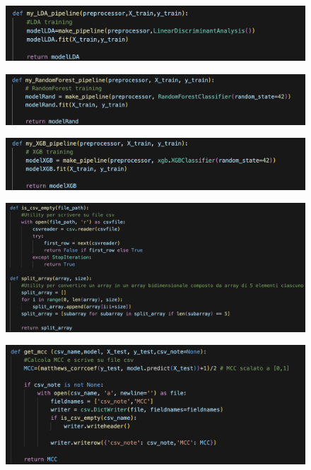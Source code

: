 \begin{appendices}
\begin{figure}[H]
    \centering
    \includegraphics[width=1\linewidth]{4.png}
    \label{fig:enter-label}
\end{figure}

\begin{figure}[H]
    \centering
    \includegraphics[width=1\linewidth]{5.png}
    \label{fig:enter-label}
\end{figure}

\begin{figure}[H]
    \centering
    \includegraphics[width=1\linewidth]{6.png}
    \label{fig:enter-label}
\end{figure}

\begin{figure}[H]
    \centering
    \includegraphics[width=1\linewidth]{7.png}
    \label{fig:enter-label}
\end{figure}

\begin{figure}[H]
    \centering
    \includegraphics[width=1\linewidth]{8.png}
    \label{fig:enter-label}
\end{figure}


\end{appendices}
